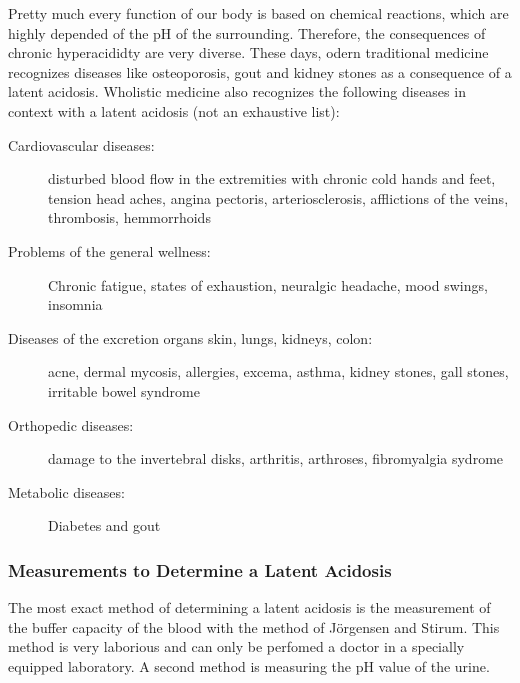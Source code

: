 \documentclass[../main.tex]{subfiles}
\begin{document}
  Pretty much every function of our body is based on chemical reactions, which are highly depended of the pH of the surrounding.
  Therefore, the consequences of chronic hyperacididty are very diverse.
  These days, odern traditional medicine recognizes diseases like osteoporosis, gout and kidney stones
  as a consequence of a latent acidosis.
  Wholistic medicine also recognizes the following diseases in context with a latent acidosis (not an exhaustive list):
  \begin{description}
  \item[Cardiovascular diseases:] disturbed blood flow in the extremities with chronic cold hands and feet,
    tension head aches, angina pectoris, arteriosclerosis,
    afflictions of the veins, thrombosis, hemmorrhoids
  \item[Problems of the general wellness:] Chronic fatigue, states of exhaustion,
    neuralgic headache, mood swings, insomnia
  \item[Diseases of the excretion organs skin, lungs, kidneys, colon:] acne, dermal mycosis,
    allergies, excema, asthma, kidney stones, gall stones,
    irritable bowel syndrome
  \item[Orthopedic diseases:] damage to the invertebral disks, arthritis, arthroses,
    fibromyalgia sydrome
  \item[Metabolic diseases:] Diabetes and gout
  \end{description}

  \subsubsection{Measurements to Determine a Latent Acidosis}

  The most exact method of determining a latent acidosis is the measurement of the buffer capacity of the blood with the method of J\"orgensen and Stirum.
  This method is very laborious and can only be perfomed a doctor in a specially equipped laboratory.
  A second method is measuring the pH value of the urine.
  
  
\end{document}
